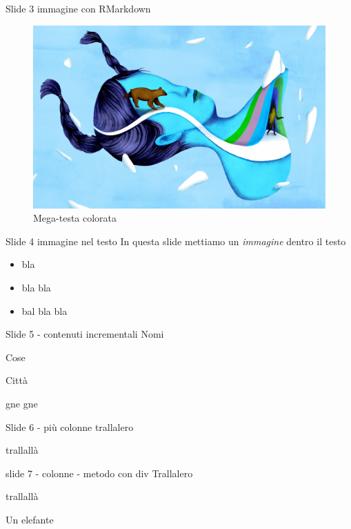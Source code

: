 \documentclass[
  ignorenonframetext,
]{beamer}
\providecommand{\tightlist}{%
  \setlength{\itemsep}{0pt}\setlength{\parskip}{0pt}}
\begin{document}
\begin{frame}{Slide 3 immagine con RMarkdown}
\protect\hypertarget{slide-3-immagine-con-rmarkdown}{}
\begin{figure}

{\centering \includegraphics[width=0.6\linewidth]{image/daydreaming5final} 

}

\caption{Mega-testa colorata}\label{fig:unnamed-chunk-1}
\end{figure}
\end{frame}

\begin{frame}{Slide 4 immagine nel testo}
\protect\hypertarget{slide-4-immagine-nel-testo}{}
In questa slide mettiamo un {\emph{immagine}} dentro il testo

\begin{itemize}
\tightlist
\item
  bla
\item
  bla bla
\item
  bal bla bla
\end{itemize}
\end{frame}

\begin{frame}{Slide 5 - contenuti incrementali}
\protect\hypertarget{slide-5---contenuti-incrementali}{}
Nomi

Cose

Città

gne gne
\end{frame}

\begin{frame}{Slide 6 - più colonne}
\protect\hypertarget{slide-6---piuxf9-colonne}{}
trallalero

trallallà
\end{frame}

\begin{frame}{slide 7 - colonne - metodo con div}
\protect\hypertarget{slide-7---colonne---metodo-con-div}{}
{Trallalero}

{trallallà}

Un elefante
\end{frame}
\end{document}
